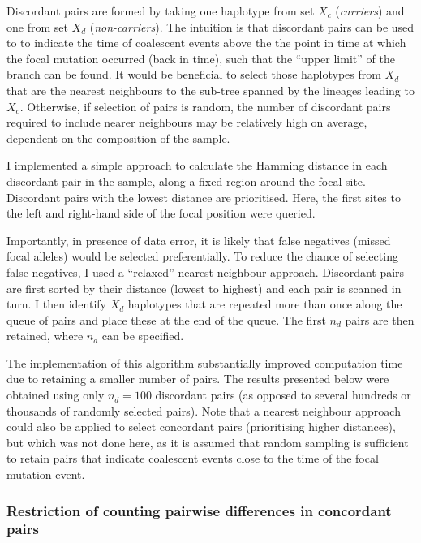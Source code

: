 Discordant pairs are formed by taking one haplotype from set $X_c$ (\emph{carriers}) and one from set $X_d$ (\emph{non-carriers}).
The intuition is that discordant pairs can be used to to indicate the time of coalescent events above the the point in time at which the focal mutation occurred (back in time), such that the ``upper limit'' of the branch can be found.
It would be beneficial to select those haplotypes from $X_d$ that are the nearest neighbours to the sub-tree spanned by the lineages leading to $X_c$.
Otherwise, if selection of pairs is random, the number of discordant pairs required to include nearer neighbours may be relatively high on average, dependent on the composition of the sample.

I implemented a simple approach to calculate the Hamming distance in each discordant pair in the sample, along a fixed region around the focal site.
Discordant pairs with the lowest distance are prioritised.
Here, the first  sites to the left and right-hand side of the focal position were queried.

Importantly, in presence of data error, it is likely that false negatives (missed focal alleles) would be selected preferentially.
To reduce the chance of selecting false negatives, I used a ``relaxed'' nearest neighbour approach.
Discordant pairs are first sorted by their distance (lowest to highest) and each pair is scanned in turn.
I then identify $X_d$ haplotypes that are repeated more than once along the queue of pairs and place these at the end of the queue.
The first $n_d$ pairs are then retained, where $n_d$ can be specified.

The implementation of this algorithm substantially improved computation time due to retaining a smaller number of pairs.
The results presented below were obtained using only $n_d=100$ discordant pairs (as opposed to several hundreds or thousands of randomly selected pairs).
Note that a nearest neighbour approach could also be applied to select concordant pairs (prioritising higher distances), but which was not done here, as it is assumed that random sampling is sufficient to retain pairs that indicate coalescent events close to the time of the focal mutation event.




%
\subsubsection{Restriction of counting pairwise differences in concordant pairs}
%

